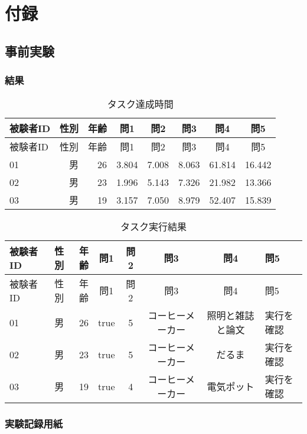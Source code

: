 \chapter{付録}\label{chap:appendix}

\section{事前実験}\label{ux4e8bux524dux5b9fux9a13}

\subsection{結果}\label{ux7d50ux679c}

\begin{longtable}[c]{@{}lrrccccc@{}}
\caption{タスク達成時間}\tabularnewline
\toprule
被験者ID & 性別 & 年齢 & 問1 & 問2 & 問3 & 問4 & 問5\tabularnewline
\midrule
\endfirsthead
\toprule
被験者ID & 性別 & 年齢 & 問1 & 問2 & 問3 & 問4 & 問5\tabularnewline
\midrule
\endhead
01 & 男 & 26 & 3.804 & 7.008 & 8.063 & 61.814 & 16.442\tabularnewline
02 & 男 & 23 & 1.996 & 5.143 & 7.326 & 21.982 & 13.366\tabularnewline
03 & 男 & 19 & 3.157 & 7.050 & 8.979 & 52.407 & 15.839\tabularnewline
\bottomrule
\end{longtable}

\begin{longtable}[c]{@{}lrrccccl@{}}
\caption{タスク実行結果}\tabularnewline
\toprule
被験者ID & 性別 & 年齢 & 問1 & 問2 & 問3 & 問4 & 問5\tabularnewline
\midrule
\endfirsthead
\toprule
被験者ID & 性別 & 年齢 & 問1 & 問2 & 問3 & 問4 & 問5\tabularnewline
\midrule
\endhead
01 & 男 & 26 & true & 5 & コーヒーメーカー & 照明と雑誌と論文 &
実行を確認\tabularnewline
02 & 男 & 23 & true & 5 & コーヒーメーカー & だるま &
実行を確認\tabularnewline
03 & 男 & 19 & true & 4 & コーヒーメーカー & 電気ポット &
実行を確認\tabularnewline
\bottomrule
\end{longtable}

\subsection{実験記録用紙}\label{ux5b9fux9a13ux8a18ux9332ux7528ux7d19}
